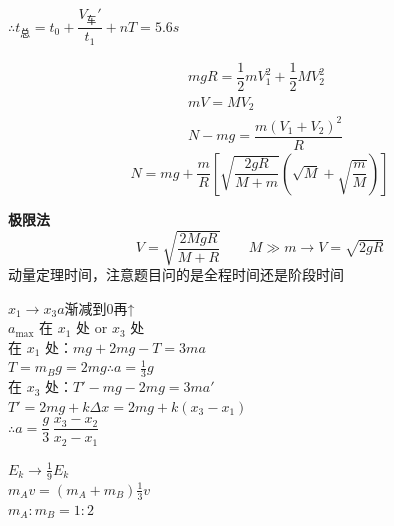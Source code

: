 $\therefore t_{\text{总}}=t_0+\dfrac{V_{\text{车}}'}{t_1}+nT=5.6\unit{s}$ %
\begin{problem}
\begin{solution}
\begin{align*}
&mgR=\dfrac12mV_1^2+\dfrac12MV_2^2\\
&mV=MV_2\\
&N-mg=\dfrac{m(V_1+V_2)^2}{R}
\end{align*}
\[ N=mg+\dfrac{m}{R}\left[\sqrt{\dfrac{2gR}{M+m}}\left(\sqrt{M}+\sqrt{\dfrac{m}{M}}\right)\right] \]
\end{solution}
\end{problem}
\textbf{极限法}
\[
V=\sqrt{\frac{2MgR}{M+R}}\qquad M\gg m\to V=\sqrt{2gR}
\] %
动量定理时间，注意题目问的是全程时间还是阶段时间 %


$x_1\to x_3$\quad $a$渐减到0再↑\\
$a_{\max}$ 在 $x_1$ 处 or $x_3$ 处\\
在 $x_1$ 处：$mg+2mg-T=3ma$\\
\hspace*{3em}$T=m_Bg=2mg$\quad $\therefore a=\frac13 g$\\
在 $x_3$ 处：$T'-mg-2mg=3ma'$\\
\hspace*{3em}$T'=2mg+k\Delta x=2mg+k(x_3-x_1)$\\
\hspace*{3em}$\therefore a=\dfrac{g}{3}\,\dfrac{x_3-x_2}{x_2-x_1}$ %

$E_k\to\frac19 E_k$\\
$m_Av=(m_A+m_B)\frac13 v$\\
$m_A:m_B=1:2$

